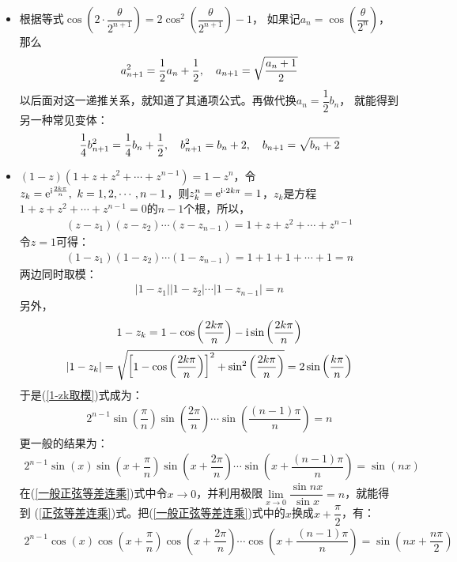 \begin{itemize}[leftmargin=\inteval{\myitemleftmargin}pt,itemsep=
   \inteval{\myitemitempsep}pt,topsep=\inteval{\myitemtopsep}pt]
\item 根据等式$ \cos\left(2\cdot \dfrac{\theta}{2^{n+1}}\right)=
2\cos^2\left(\dfrac{\theta}{2^{n+1}}\right)-1 $，
如果记$ a_n=\cos\left(\dfrac{\theta}{2^n}\right) $，那么
\begin{gather*}
    a_{n+1}^2=\dfrac{1}{2}a_n+\dfrac{1}{2},\quad a_{n+1}=\sqrt{\dfrac{a_n+1}{2}}
\end{gather*}
以后面对这一递推关系，就知道了其通项公式。再做代换$ a_{n}=\dfrac{1}{2}b_n $，
就能得到另一种常见变体：
\begin{gather*}
    \dfrac{1}{4}b_{n+1}^2=\dfrac{1}{4}b_n+\dfrac{1}{2},\quad 
    b_{n+1}^2=b_n+2,\quad b_{n+1}=\sqrt{b_n+2}
\end{gather*}

\item $ (1-z)(1+z+z^2+\cdots +z^{n-1})=1-z^{n} $，令$ z_k=\mathrm{e}^{\mathrm{i}\frac{2k\pi}{n}},
\ k=1,2,\cdots,n-1 $，则$ z_k^n=\mathrm{e}^{\mathrm{i}\cdot 2k\pi}=1 $，$ z_k $是方程
$ 1+z+z^2+\cdots +z^{n-1}=0 $的$ n-1 $个根，所以，
\begin{gather*}
    (z-z_1)(z-z_2)\cdots(z-z_{n-1})=1+z+z^2+\cdots +z^{n-1}
\end{gather*}
令$ z=1 $可得：
\begin{gather*}
    (1-z_1)(1-z_2)\cdots(1-z_{n-1})=1+1+1+\cdots +1=n
\end{gather*}
两边同时取模：
\begin{gather}\label{1-zk取模}
    |1-z_1||1-z_2|\cdots|1-z_{n-1}|=n
\end{gather}
另外，
\begin{gather*}
    1-z_k=1-\cos\left(\dfrac{2k\pi}{n} \right)-
            \mathrm{i}\sin\left(\dfrac{2k\pi}{n} \right) \\ 
    |1-z_k|=\sqrt{\left[1-\cos\left(\dfrac{2k\pi}{n} \right) \right]^2+
   \sin^2 \left(\dfrac{2k\pi}{n} \right) }=2\sin\left(\dfrac{k\pi}{n}\right)
\end{gather*}
于是(\ref{1-zk取模})式成为：
\begin{align}\label{正弦等差连乘}
    2^{n-1}\sin\left(\dfrac{\pi}{n} \right)\sin\left(\dfrac{2\pi}{n} \right)\cdots
    \sin\left(\dfrac{(n-1)\pi}{n} \right)=n
\end{align}
更一般的结果为：
\begin{align}\label{一般正弦等差连乘}
    2^{n-1}\sin(x)\sin\left(x+\dfrac{\pi}{n} \right)\sin\left(x+\dfrac{2\pi}{n} \right)\cdots
    \sin\left(x+\dfrac{(n-1)\pi}{n} \right)=\sin(nx)
\end{align}
在(\ref{一般正弦等差连乘})式中令$ x \to 0 $，并利用极限$ \lim\limits_{x\to 0}\dfrac{\sin nx}{\sin x}=n $，就能得到
(\ref{正弦等差连乘})式。把(\ref{一般正弦等差连乘})式中的$ x $换成$ x+\dfrac{\pi}{2} $，有：
\begin{align}\label{余弦等差连乘}
    2^{n-1}\cos(x)\cos\left(x+\dfrac{\pi}{n} \right)\cos\left(x+\dfrac{2\pi}{n}
    \right)\cdots \cos\left(x+\dfrac{(n-1)\pi}{n} \right) 
    = \sin\left( nx+\dfrac{n\pi}{2}\right) 
\end{align}


\end{itemize}
